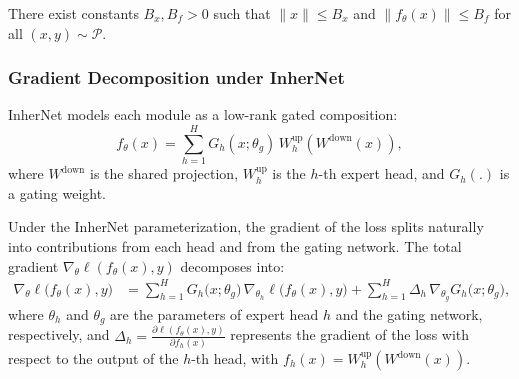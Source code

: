 \documentclass{article} %
\begin{document}
\begin{assumption}
\label{assumption:bounded}
There exist constants $B_x, B_f > 0$ such that $\|x\| \leq B_x$ and $\|f_\theta(x)\| \leq B_f$ for all $(x,y)\sim \mathcal{P}$.
\end{assumption}

\subsubsection{Gradient Decomposition under InherNet}

InherNet models each module as a low-rank gated composition:
\begin{equation}
f_\theta(x) = \sum_{h=1}^H G_h(x;\theta_g)\, W^{\text{up}}_h(W^{\text{down}}(x)),
\end{equation}
where $W^{\text{down}}$ is the shared projection, $W^{\text{up}}_h$ is the $h$-th expert head, and $G_h(.)$ is a gating weight.


\begin{lemma}
\label{lemma:gradient-decomposition}
Under the InherNet parameterization, the gradient of the loss splits naturally into contributions from each head and from the gating network. The total gradient $\nabla_\theta \ell(f_\theta(x), y)$ decomposes into:
\begin{equation}
\begin{aligned}
\nabla_\theta \ell\!\bigl(f_\theta(x),y\bigr)
&= \sum_{h=1}^H G_h\!\bigl(x;\theta_g\bigr)\,\nabla_{\theta_h}\ell\!\bigl(f_\theta(x),y\bigr) + \sum_{h=1}^H \Delta_h\,\nabla_{\theta_g} G_h\!\bigl(x;\theta_g\bigr),
\end{aligned}
\end{equation}
where $\theta_h$ and $\theta_g$ are the parameters of expert head $h$ and the gating network, respectively, and $\Delta_h = \frac{\partial \ell(f_\theta(x),y)}{\partial f_h(x)}$ represents the gradient of the loss with respect to the output of the $h$-th head, with $f_h(x) = W^{\text{up}}_h(W^{\text{down}}(x))$.
\end{lemma}
\end{document}
